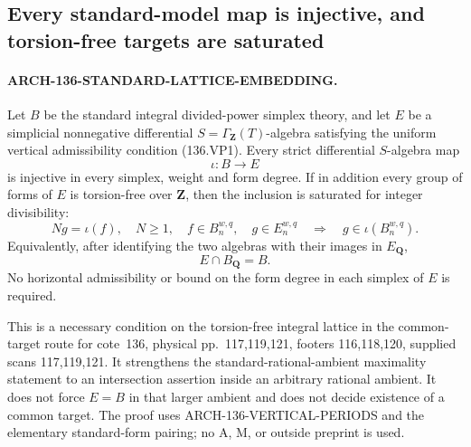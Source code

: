 \subsection{Every standard-model map is injective, and torsion-free targets are saturated}
\label{arch136:standard-lattice-embedding}

\paragraph{ARCH-136-STANDARD-LATTICE-EMBEDDING.}
Let \(B\) be the standard integral divided-power simplex theory,
and let \(E\) be a simplicial nonnegative differential
\(S=\Gamma_{\mathbf Z}(T)\)-algebra satisfying the uniform
vertical admissibility condition (136.VP1).
Every strict differential \(S\)-algebra map
\[
                            \iota:B\longrightarrow E
 \tag{136.SE1}
\]
is injective in every simplex, weight and form degree.
If in addition every group of forms of \(E\) is torsion-free
over \(\mathbf Z\), then the inclusion is saturated for
integer divisibility:
\[
 N g=\iota(f),\quad N\geq1,\quad f\in B_n^{w,q},
 \quad g\in E_n^{w,q}
       \quad\Longrightarrow\quad
              g\in\iota(B_n^{w,q}).
 \tag{136.SE2}
\]
Equivalently, after identifying the two algebras with their
images in \(E_{\mathbf Q}\),
\[
                             E\cap B_{\mathbf Q}=B.
 \tag{136.SE3}
\]
No horizontal admissibility or bound on the form degree in
each simplex of \(E\) is required.

This is a necessary condition on the torsion-free integral
lattice in the common-target route for cote~136, physical
pp.~117,119,121, footers 116,118,120, supplied scans 117,119,121.
It strengthens the standard-rational-ambient maximality
statement to an intersection assertion inside an arbitrary
rational ambient. It does not force \(E=B\) in that larger
ambient and does not decide existence of a common target.
The proof uses ARCH-136-VERTICAL-PERIODS and the elementary
standard-form pairing; no A, M, or outside preprint is used.

